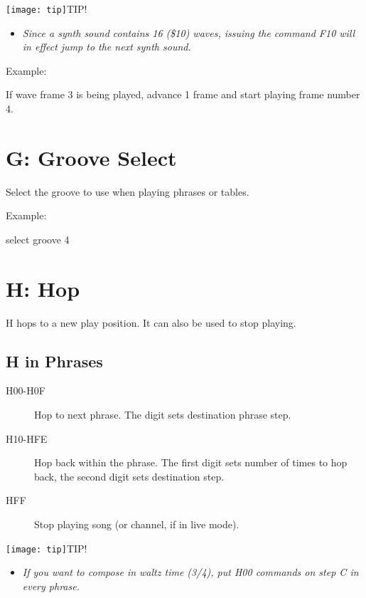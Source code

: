\texttt{[image: tip]}TIP!
\begin{itemize}
        \item \textit{Since a synth sound contains 16 (\$10) waves, issuing the command \textsc{F10} will in effect jump to the next synth sound.}
	\end{itemize}

\begin{description}
\item Example:
\item[F01] If wave frame 3 is being played, advance 1 frame and start playing frame number 4.
\end{description}

\section{G: Groove Select}

Select the groove to use when playing phrases or tables.

\begin{description}
\item Example:
\item[G04] select groove 4
\end{description}

\section{H: Hop}

H hops to a new play position. It can also be used to stop playing.

\subsection{H in Phrases}

\begin{description}
    \item[H00-H0F] Hop to next phrase. The digit sets destination phrase step.
    \item[H10-HFE] Hop back within the phrase. The first digit sets number of times to hop back, the second digit sets destination step.
    \item[HFF] Stop playing song (or channel, if in live mode).
\end{description}

\texttt{[image: tip]}TIP!
\nolinebreak
\begin{itemize}
        \item \textit{If you want to compose in waltz time (3/4), put \textsc{H00} commands on step \textsc{C} in every phrase.}
\end{itemize}

